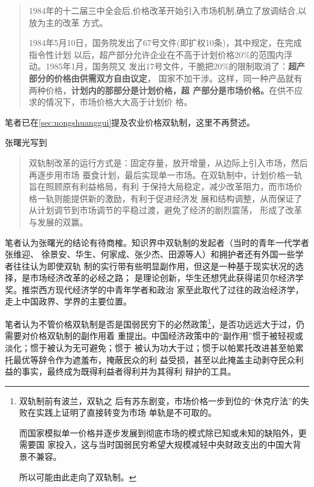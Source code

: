 \begin{quotation}
  1984年的十二届三中全会后,价格改革开始引入市场机制,确立了放调结合,以放为主的改革
  方式。\cite{wangqiangshehui}

  1984年5月10日，国务院发出了67号文件(即扩权10条)，其中规定，在完成指令性计划
  以后，超产部分允许企业在不高于计划价格20\%的范围内浮动。1985年1月，国务院又
  发出17号文件，干脆把20\%的限制取消了：\textbf{超产部分的价格由供需双方自由议定}，
  国家不加干涉。这样，同一种产品就有两种价格，\textbf{计划内的那部分是计划价格，超
    产部分是市场价格。}在供不应求的情况下，市场价格大大高于计划价
  格。\cite{yangshuanggui}
\end{quotation}

笔者已在\cref{sec:nongshuanggui}提及农业价格双轨制，这里不再赘述。

张曙光写到
\begin{quotation}
  双轨制改革的运行方式是：固定存量，放开增量，从边际上引入市场，然后再逐步用市场
  蚕食计划，最后实现单一市场。在双轨制中，计划价格一轨旨在照顾原有利益格局，有利
  于保持大局稳定，减少改革阻力，而市场价格一轨则能提供新的激励，有利于促进经济发
  展和结构调整，从而保证了从计划调节到市场调节的平稳过渡，避免了经济的剧烈震荡，
  形成了改革与发展的双赢。
\end{quotation}

笔者认为张曙光的结论有待商榷。知识界中双轨制的发起者（当时的青年一代学者张维迎、
徐景安、华生、何家成、张少杰、田源等人）和拥护者还有外国一些学者往往认为即使双轨
制的实行带有些明显副作用，但这是一种基于现实状况的选择，是市场经济改革的必经之路；
是理论创新，华生还想凭此获得诺贝尔经济学奖。推崇西方现代经济学的中青年学者和政治
家至此取代了过往的政治经济学，走上中国政界、学界的主要位置。

笔者认为不管价格双轨制是否是国弱民穷下的必然政策\footnote{双轨制前有波兰，双轨之
  后有苏东剧变，市场价格一步到位的“休克疗法”的失败在实践上证明了直接转变为市场
  单轨是不可取的。

  而国家模拟单一价格并逐步发展到彻底市场的模式除已知或未知的缺陷外，更需要国
  家投入，这与当时国弱民穷希望大规模减轻中央财政支出的中国大背景不兼容。

  所以可能由此走向了双轨制。}，是否功远远大于过，仍需要对价格双轨制的副作用着
重提出。中国经济政策中的“副作用”惯于被轻视或淡化；惯于被认为无可避免；惯于
被认为功大于过；惯于以帕累托改进甚至帕累托最优等辞令作为遮羞布，掩蔽民众的利
益受损，甚至以此掩盖主动剥夺民众利益的事实，最终成为既得利益者得利并为其得利
辩护的工具。

